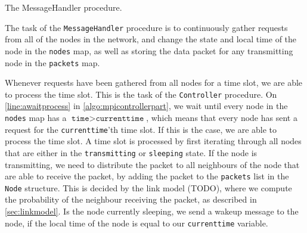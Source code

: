 \begin{algorithm}[ht]
    \DontPrintSemicolon
    
    \caption{The MessageHandler procedure.}
    \label{algo:mpimessagehandler}
\end{algorithm}

The task of the \texttt{MessageHandler} procedure is to continuously gather requests from all of the nodes in the network, and change the state and local time of the node in the \texttt{nodes} map, as well as storing the data packet for any transmitting node in the \texttt{packets} map. \medbreak

Whenever requests have been gathered from all nodes for a time slot, we are able to process the time slot. This is the task of the \texttt{Controller} procedure. On \autoref{line:awaitprocess} in \autoref{algo:mpicontrollerpart}, we wait until every node in the \texttt{nodes} map has a $\texttt{time} > \texttt{currenttime}$, which means that every node has sent a request for the \texttt{currenttime}'th time slot. If this is the case, we are able to process the time slot. A time slot is processed by first iterating through all nodes that are either in the \texttt{transmitting} or \texttt{sleeping} state. If the node is transmitting, we need to distribute the packet to all neighbours of the node that are able to receive the packet, by adding the packet to the \texttt{packets} list in the \texttt{Node} structure. This is decided by the link model (TODO), where we compute the probability of the neighbour receiving the packet, as described in \autoref{sec:linkmodel}. Is the node currently sleeping, we send a wakeup message to the node, if the local time of the node is equal to our \texttt{currenttime} variable. \smallbreak

